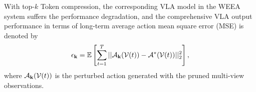 \documentclass[lettersize,journal]{IEEEtran}
\theoremstyle{custom}
\begin{document}
With top-$k$ Token compression, the corresponding VLA model in the WEEA system suffers the performance degradation, and the comprehensive VLA output performance in terms of long-term average action mean square error (MSE) \cite{} is denoted by 
\begin{align}
    \epsilon_{\bf k} = \mathbb{E} \left[\sum_{t = 1}^T\vert\vert \mathcal{A}_{\bf k}(\mathcal{V}(t)) - \mathcal{A}^*(\mathcal{V}(t)) \vert\vert^2_2\right], 
\end{align}
where $\mathcal{A}_{\bf k}(\mathcal{V}(t))$ is the perturbed action generated with the pruned multi-view observations. 



\end{document}
